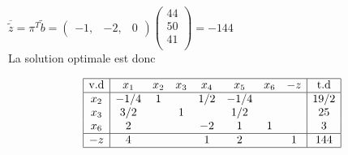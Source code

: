 \documentclass{article}
\begin{document}
\begin{center}
   $\overline{\tilde{z}} = \pi^T\tilde{b} 
   =
   \begin{pmatrix}
      -1,&-2,&0
   \end{pmatrix}
   \begin{pmatrix}
     44\\ 
     50\\
     41\\
   \end{pmatrix}
   =
   -144$\\ 
   \vspace{5mm} %
   La solution optimale est donc 
\begin{spacing}{1.5}
   \begin{equation*}
      \begin{array}{|c|ccccccc|c|}
         \hline
         \text{v.d} & x_1 & x_2 & x_3 & x_4 & x_5 & x_6 & -z & \text{t.d} \\ \hline
       x_2&  -1/4  &  1  &     &  1/2  &  -1/4  &   &   & 19/2 \\
       x_3&  3/2   &     &  1  &      &   1/2  &   &   & 25\\  
       x_6&  2     &     &     &  -2   &  1     & 1 &   & 3 \\ \hline 
       -z & 4    &   &    &  1   &  2     &  & 1 & 144 \\ \hline
      \end{array}
      \end{equation*}
\end{spacing}
\end{center}
\pagebreak
\end{document}
